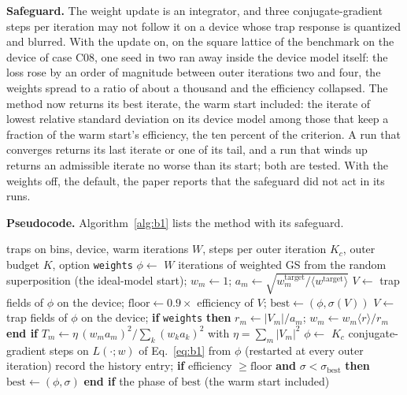 \textbf{Safeguard.} The weight update is an integrator, and three conjugate-gradient steps per iteration may not follow it on a device whose trap response is quantized and blurred. With the update on, on the square lattice of the benchmark on the device of case C08, one seed in two ran away inside the device model itself: the loss rose by an order of magnitude between outer iterations two and four, the weights spread to a ratio of about a thousand and the efficiency collapsed. The method now returns its best iterate, the warm start included: the iterate of lowest relative standard deviation on its device model among those that keep a fraction \bOneFloor{} of the warm start's efficiency, the ten percent of the criterion. A run that converges returns its last iterate or one of its tail, and a run that winds up returns an admissible iterate no worse than its start; both are tested. With the weights off, the default, the paper reports that the safeguard did not act in its runs.

\textbf{Pseudocode.} Algorithm~\ref{alg:b1} lists the method with its safeguard.

\begin{algorithm}[t]
\caption{Device-aware conjugate-gradient refinement: conjugate-gradient steps on the device-aware loss (with the weight update when the option is set, which is off by default), and the safeguard that returns the best admissible iterate.}
\label{alg:b1}
\begin{algorithmic}[1]
\Require traps on bins, device, warm iterations $W$, steps per outer iteration $K_c$, outer budget $K$, option \texttt{weights}
\State $\phi\gets$ $W$ iterations of weighted GS from the random superposition (the ideal-model start); $w_m\gets1$; $a_m\gets\sqrt{w^{\mathrm{target}}_m/\langle w^{\mathrm{target}}\rangle}$
\State $V\gets$ trap fields of $\phi$ on the device; $\mathrm{floor}\gets0.9\times$ efficiency of $V$; $\mathrm{best}\gets(\phi,\sigma(V))$
  \State $V\gets$ trap fields of $\phi$ on the device; \textbf{if} \texttt{weights} \textbf{then} $r_m\gets|V_m|/a_m$; $w_m\gets w_m\langle r\rangle/r_m$ \textbf{end if}
  \State $T_m\gets\eta\,(w_ma_m)^2/\sum_k(w_ka_k)^2$ with $\eta=\sum_m|V_m|^2$
  \State $\phi\gets$ $K_c$ conjugate-gradient steps on $L(\cdot;w)$ of Eq.~\eqref{eq:b1} from $\phi$ (restarted at every outer iteration)
  \State record the history entry; \textbf{if} efficiency $\ge\mathrm{floor}$ \textbf{and} $\sigma<\sigma_{\mathrm{best}}$ \textbf{then} $\mathrm{best}\gets(\phi,\sigma)$ \textbf{end if}
\EndFor
\State \Return the phase of $\mathrm{best}$ (the warm start included)
\end{algorithmic}
\end{algorithm}

